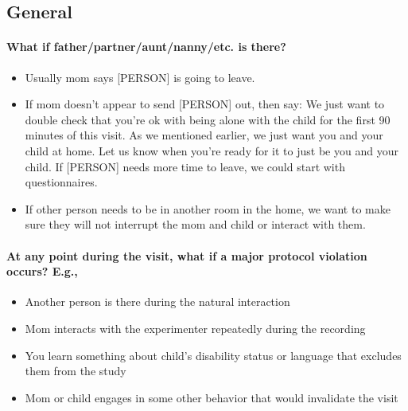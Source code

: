 \documentclass[
  12pt,
]{book}
\providecommand{\tightlist}{%
  \setlength{\itemsep}{0pt}\setlength{\parskip}{0pt}}
\begin{document}
\hypertarget{general}{%
\subsection{General}\label{general}}

\hypertarget{what-if-fatherpartnerauntnannyetc.-is-there}{%
\paragraph*{What if father/partner/aunt/nanny/etc. is there?}\label{what-if-fatherpartnerauntnannyetc.-is-there}}

\begin{itemize}
\tightlist
\item
  Usually mom says {[}PERSON{]} is going to leave.\\
\item
  If mom doesn't appear to send {[}PERSON{]} out, then say: We just want to double check that you're ok with being alone with the child for the first 90 minutes of this visit. As we mentioned earlier, we just want you and your child at home. Let us know when you're ready for it to just be you and your child. If {[}PERSON{]} needs more time to leave, we could start with questionnaires.
\item
  If other person needs to be in another room in the home, we want to make sure they will not interrupt the mom and child or interact with them.
\end{itemize}

\hypertarget{at-any-point-during-the-visit-what-if-a-major-protocol-violation-occurs-e.g.}{%
\paragraph*{At any point during the visit, what if a major protocol violation occurs? E.g.,}\label{at-any-point-during-the-visit-what-if-a-major-protocol-violation-occurs-e.g.}}

\begin{itemize}
\tightlist
\item
  Another person is there during the natural interaction
\item
  Mom interacts with the experimenter repeatedly during the recording
\item
  You learn something about child's disability status or language that excludes them from the study
\item
  Mom or child engages in some other behavior that would invalidate the visit
\end{itemize}
\end{document}
